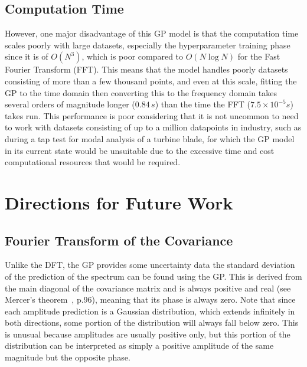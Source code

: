 \documentclass[12pt]{article}
\begin{document}
    \subsection{Computation Time}
    However, one major disadvantage of this GP model is that the computation time scales poorly with large datasets, especially the hyperparameter training phase since it is of $O(N^3)$, which is poor compared to $O(N \log{N})$ for the Fast Fourier Transform (FFT).
    This means that the model handles poorly datasets consisting of more than a few thousand points, and even at this scale, fitting the GP to the time domain then converting this to the frequency domain takes several orders of magnitude longer ($0.84 \, s$) than the time the FFT ($7.5 \times 10^{-5}s$) takes run.
    This performance is poor considering that it is not uncommon to need to work with datasets consisting of up to a million datapoints in industry, such as during a tap test for modal analysis of a turbine blade, for which the GP model in its current state would be unsuitable due to the excessive time and cost computational resources that would be required.

    \section{Directions for Future Work}
    \subsection{Fourier Transform of the Covariance}
    Unlike the DFT, the GP provides some uncertainty data the standard deviation of the prediction of the spectrum can be found using the GP\@.
    This is derived from the main diagonal of the covariance matrix and is always positive and real (see Mercer's theorem~\cite{rasmussen2006gaussian}, p.96), meaning that its phase is always zero.
    Note that since each amplitude prediction is a Gaussian distribution, which extends infinitely in both directions, some portion of the distribution will always fall below zero.
    This is unusual because amplitudes are usually positive only, but this portion of the distribution can be interpreted as simply a positive amplitude of the same magnitude but the opposite phase.
\end{document}
